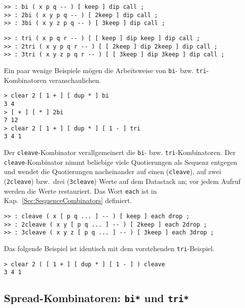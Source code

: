 \begin{verbatim}
>> : bi ( x p q -- ) [ keep ] dip call ;
>> : 2bi ( x y p q -- ) [ 2keep ] dip call ;
>> : 3bi ( x y z p q -- ) [ 3keep ] dip call ;
\end{verbatim}

\begin{verbatim}
>> : tri ( x p q r -- ) [ [ keep ] dip keep ] dip call ;
>> : 2tri ( x y p q r -- ) [ [ 2keep ] dip 2keep ] dip call ;
>> : 3tri ( x y z p q r -- ) [ [ 3keep ] dip 3keep ] dip call ;
\end{verbatim}

Ein paar wenige Beispiele mögen die Arbeitsweise von \verb|bi|- bzw. \verb|tri|-Kombinatoren veranschaulichen.

\begin{verbatim}
> clear 2 [ 1 + ] [ dup * ] bi
3 4
> [ + ] [ * ] 2bi
7 12
> clear 2 [ 1 + ] [ dup * ] [ 1 - ] tri
3 4 1
\end{verbatim}

Der \verb|cleave|-Kombinator verallgemeinert die \verb|bi|- bzw. \verb|tri|-Kombinatoren. Der \verb|cleave|-Kombinator nimmt beliebige viele Quotierungen als Sequenz entgegen und wendet die Quotierungen nacheinander auf einen (\verb|cleave|), auf zwei (\verb|2cleave|) bzw.\ drei (\verb|3cleave|) Werte auf dem Datastack an; vor jedem Aufruf werden die Werte restauriert. Das Wort \verb|each| ist in Kap.~\ref{Sec:SequenceCombinators} definiert.

\begin{verbatim}
>> : cleave ( x [ p q ... ] -- ) [ keep ] each drop ;
>> : 2cleave ( x y [ p q ... ] -- ) [ 2keep ] each 2drop ;
>> : 3cleave ( x y z [ p q ... ] -- ) [ 3keep ] each 3drop ;
\end{verbatim}

Das folgende Beispiel ist identisch mit dem vorstehenden \verb|tri|-Beispiel.

\begin{verbatim}
> clear 2 ( [ 1 + ] [ dup * ] [ 1 - ] ) cleave
3 4 1
\end{verbatim}

\subsection{Spread-Kombinatoren: \texttt{bi*} und \texttt{tri*}}

